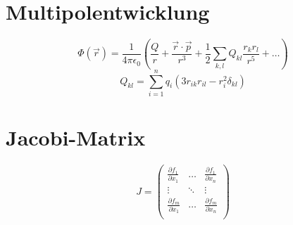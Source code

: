 \documentclass{scrartcl}
\begin{document}
\section{Multipolentwicklung}
\begin{equation}
  \Phi(\vec{r}) = \frac{1}{4\pi\epsilon_0}\left(\frac{Q}{r} + 
  \frac{\vec{r} \cdot \vec{p}}{r^3} + \frac{1}{2} \sum_{k, l} Q_{kl} \frac{r_k r_l}{r^5} + \dots\right)
\end{equation}
\begin{equation*}
  Q_{kl} = \sum_{i = 1}^n q_i \left(3 r_{ik} r_{il} - r_i^2 \delta_{kl}\right)
\end{equation*}

\section{Jacobi-Matrix}
\begin{equation}
  J =
  \begin{pmatrix}
    \frac{\partial f_1}{\partial x_1} & \dots  & \frac{\partial f_1}{\partial x_n} \\
    \vdots                            & \ddots & \vdots                            \\ 
    \frac{\partial f_m}{\partial x_1} & \dots  & \frac{\partial f_m}{\partial x_n} \\
  \end{pmatrix}
\end{equation}
\end{document}

